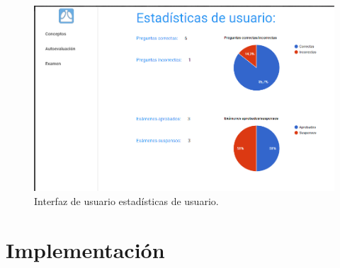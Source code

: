 \begin{figure}[!ht]
  \begin{center}
    \includegraphics[width=1\textwidth]{../images/interfaz_estadisticas.png}
    \caption{Interfaz de usuario estadísticas de usuario.}
    \label{fig:interfaz_estadisticas}
  \end{center}
\end{figure}



\newpage

\section{Implementación}

